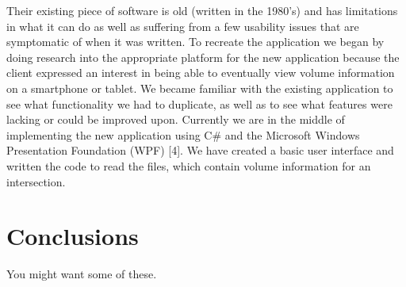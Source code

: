 \documentclass{article}
\begin{document}
Their existing piece of software is old (written in the
1980’s) and has limitations in what it can do as well as
suffering from a few usability issues that are symptomatic of
when it was written.
To recreate the application we began by doing research into
the appropriate platform for the new application because the
client expressed an interest in being able to eventually view
volume information on a smartphone or tablet. We became
familiar with the existing application to see what functionality
we had to duplicate, as well as to see what features were
lacking or could be improved upon.
Currently we are in the middle of implementing the new
application using C\# and the Microsoft Windows Presentation
Foundation (WPF) [4]. We have created a basic user interface
and written the code to read the files, which contain volume
information for an intersection.

\section{Conclusions}
You might want some of these.




\end{document}
